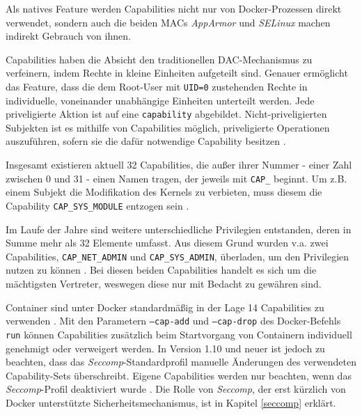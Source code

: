 \documentclass[../main.tex]{subfiles}
\begin{document}
			Als natives Feature werden Capabilities nicht nur von Docker-Prozessen direkt verwendet, sondern auch die beiden MACs \emph{AppArmor} und \emph{SELinux} machen indirekt Gebrauch von ihnen.

			Capabilities haben die Absicht den traditionellen DAC-Mechanismus zu verfeinern, indem Rechte in kleine Einheiten aufgeteilt sind. Genauer ermöglicht das Feature, dass die dem Root-User mit \texttt{UID=0} zustehenden Rechte in individuelle, voneinander unabhängige Einheiten unterteilt werden. Jede priveligierte Aktion ist auf eine \texttt{capability} abgebildet. Nicht-priveligierten Subjekten ist es mithilfe von Capabilities möglich, priveligierte Operationen auszuführen, sofern sie die dafür notwendige Capability besitzen \cite[S.33]{linuxInterface}\cite[S.39]{SELinuxApparmor}.

			Insgesamt existieren aktuell 32 Capabilities, die außer ihrer Nummer - einer Zahl zwischen 0 und 31 - einen Namen tragen, der jeweils mit \texttt{CAP\_} beginnt. Um z.B. einem Subjekt die Modifikation des Kernels zu verbieten, muss diesem die Capability \texttt{CAP\_SYS\_MODULE} entzogen sein \cite[S.42]{SELinuxApparmor}.

			Im Laufe der Jahre sind weitere unterschiedliche Privilegien entstanden, deren in Summe mehr als 32 Elemente umfasst. Aus diesem Grund wurden v.a. zwei Capabilities, \texttt{CAP\_NET\_ADMIN} und \texttt{CAP\_SYS\_ADMIN}, überladen, um den Privilegien nutzen zu können \cite[S.40f.]{SELinuxApparmor}. Bei diesen beiden Capabilities handelt es sich um die mächtigsten Vertreter, weswegen diese nur mit Bedacht zu gewähren sind.

			Container sind unter Docker standardmäßig in der Lage 14 Capabilities zu verwenden \cite{githubCapabilities}. Mit den Parametern \texttt{--cap-add} und \texttt{--cap-drop} des Docker-Befehls \texttt{run} können Capabilities zusätzlich beim Startvorgang von Containern individuell genehmigt oder verweigert werden. In Version 1.10 und neuer ist jedoch zu beachten, dass das \emph{Seccomp}-Standardprofil manuelle Änderungen des verwendeten Capability-Sets überschreibt. Eigene Capabilities werden nur beachten, wenn das \emph{Seccomp}-Profil deaktiviert wurde \cite{dockerRun}. Die Rolle von \emph{Seccomp}, der erst kürzlich von Docker unterstützte Sicherheitsmechanismus, ist in Kapitel \ref{seccomp} erklärt.


\end{document}
